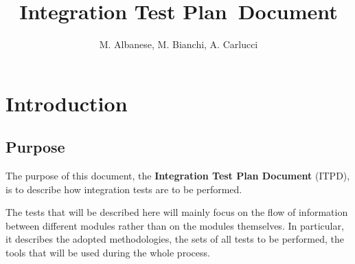 \documentclass[a4paper, 12pt]{article}
\newcounter{tc}
\begin{document}
\newcommand{\code}[1]{
    \texttt{#1}
}

\newcommand{\testx}[7]{
	\stepcounter{tc}
	\subsubsection{Test \thetc: #1} %

	\begin{tabular}{l p{0.7\textwidth}}
    \hline
    \textbf{Test Case Identifier} & \thetc\\
    \hline
    \textbf{Test Item(s)} & \code{#2} $\rightarrow$ \code{#3}\\
    \hline
    \textbf{Input Specification} & #4\\
    \hline
    \textbf{Output Specification} & #5\\
    \hline
    \textbf{Environmental Needs} & #6\\
    \hline
    \textbf{Test Description} & #7\\
    \hline
	\end{tabular}
}

\title{Integration Test Plan Document}

\author{M. Albanese, M. Bianchi, A. Carlucci}

\maketitle
\newpage{}
\tableofcontents{}

\newpage{}

\section{Introduction}

\subsection{Purpose}
\label{sub:purpose}
The purpose of this document, the \textbf{Integration Test Plan Document} (ITPD), is to describe how integration tests are to be performed.

The tests that will be described here will mainly focus on the flow of information between different modules rather than on the modules themselves.
In particular, it describes the adopted methodologies, the sets of all tests to be performed, the tools that will be used during the whole process.
\end{document}
